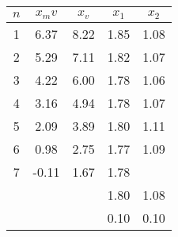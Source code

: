 \begin{tabular}[t]{
  S[table-format = 1.0]
  S[table-format = 2.2]
  S[table-format = 1.2] 
  S[table-format = 1.2] 
  S[table-format = 1.2] 
} \toprule
{$n$}            & {$x_mv$} & {$x_v$} & {$x_1$} & {$x_2$} \\                & 6.37     & 8.22    & 1.85    & 1.08    \\
2                & 5.29     & 7.11    & 1.82    & 1.07    \\
3                & 4.22     & 6.00    & 1.78    & 1.06    \\
4                & 3.16     & 4.94    & 1.78    & 1.07    \\
5                & 2.09     & 3.89    & 1.80    & 1.11    \\
6                & 0.98     & 2.75    & 1.77    & 1.09    \\
7                & -0.11    & 1.67    & 1.78    &         \\\midrule
{}  &          &         & 1.80    & 1.08    \\
{}   &          &         & 0.10    & 0.10    \\\bottomrule
\end{tabular}